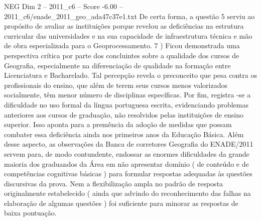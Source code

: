 \begin{textsample}{NEG Dim 2 – 2011\_c6 – Score -6.00 – 2011\_c6/enade\_2011\_geo\_ada47c37e1.txt}
De certa forma, a questão 5 serviu ao propósito de avaliar as instituições porque revelou as deficiências na estrutura curricular das universidades e na sua capacidade de infraestrutura técnica e mão de obra especializada para o Geoprocessamento. 7 ) Ficou demonstrada uma perspectiva crítica por parte dos concluintes sobre a qualidade dos cursos de Geografia, especialmente na diferenciação de qualidade na formação entre Licenciatura e Bacharelado.
Tal percepção revela o preconceito que pesa contra os profissionais do ensino, que além de terem seus cursos menos valorizados socialmente, têm menor número de disciplinas específicas.
Por fim, registra -se a dificuldade no uso formal da língua portuguesa escrita, evidenciando problemas anteriores aos cursos de graduação, não resolvidos pelas instituições de ensino superior.
Isso aponta para a premência da adoção de medidas que possam combater essa deficiência ainda nos primeiros anos da Educação Básica.
Além desse aspecto, as observações da Banca de corretores Geografia do ENADE/2011 servem para, de modo contundente, endossar as enormes dificuldades da grande maioria dos graduandos da Área em não apresentar domínio ( de conteúdo e de competências cognitivas básicas ) para formular respostas adequadas às questões discursivas da prova.
Nem a flexibilização ampla no padrão de resposta originalmente estabelecido ( ainda que advindo do reconhecimento das falhas na elaboração de algumas questões ) foi suficiente para minorar as respostas de baixa pontuação.

\end{textsample}
